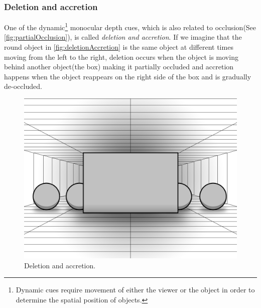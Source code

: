 \subsubsection{Deletion and accretion}
One of the dynamic\footnote{Dynamic cues require movement of either the viewer or the object in order to determine the spatial position of objects\citep{sensationPerception}.} monocular depth cues, which is also related to occlusion(See \autoref{fig:partialOcclusion}), is called \textit{deletion and accretion}. If we imagine that the round object in \autoref{fig:deletionAccretion} is the same object at different times moving from the left to the right, deletion occurs when the object is moving behind another object(the box) making it partially occluded and accretion happens when the object reappears on the right side of the box and is gradually de-occluded\citep{sensationPerception}.
\begin{figure}[H]
	\centering
	\includegraphics[width=0.8\linewidth]{figure/Analysis/deletionAccretion.png}
	\caption{Deletion and accretion.}
	\label{fig:deletionAccretion}
\end{figure}


